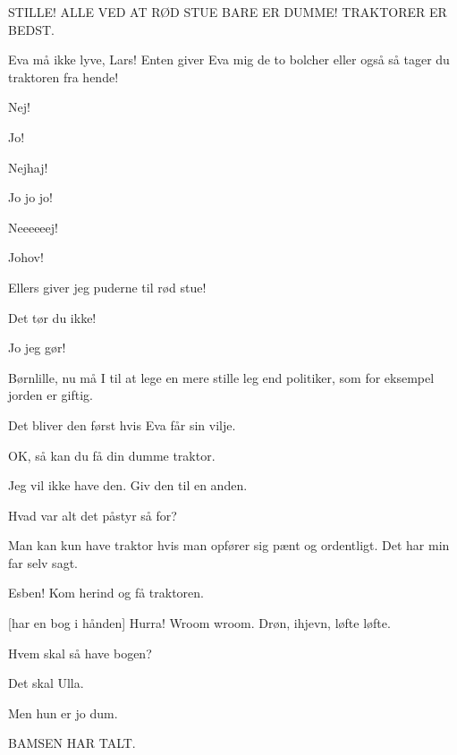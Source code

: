 \documentclass[a4paper,11pt]{article}
\begin{document}
\begin{sketch}
 STILLE!  ALLE VED AT RØD STUE BARE ER DUMME!  TRAKTORER ER BEDST.

 Eva må ikke lyve, Lars!  Enten giver Eva mig de to bolcher eller også så tager du traktoren fra hende!

 Nej!

 Jo!

 Nejhaj!

 Jo jo jo!

 Neeeeeej!

 Johov!

 Ellers giver jeg puderne til rød stue!

 Det tør du ikke!

 Jo jeg gør!


 Børnlille, nu må I til at lege en mere stille leg end politiker, som for eksempel jorden er giftig.

 Det bliver den først hvis Eva får sin vilje.


 OK, så kan du få din dumme traktor.


 Jeg vil ikke have den.  Giv den til en anden.

 Hvad var alt det påstyr så for?

 Man kan kun have traktor hvis man opfører sig pænt og ordentligt.  Det har min far selv sagt.

 Esben!  Kom herind og få traktoren.

[har en bog i hånden] Hurra!  Wroom wroom.  Drøn, ihjevn, løfte løfte.

 Hvem skal så have bogen?

 Det skal Ulla.


 Men hun er jo dum.

 BAMSEN HAR TALT.


\end{sketch}
\end{document}
